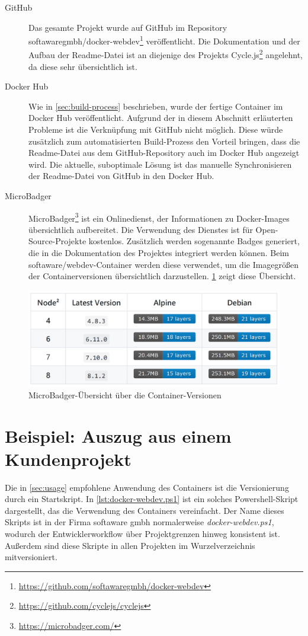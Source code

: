 \begin{description}
    \item[GitHub] Das gesamte Projekt wurde auf GitHub im Repository softawaregmbh/docker-webdev\footnote{\url{https://github.com/softawaregmbh/docker-webdev}} veröffentlicht.
        Die Dokumentation und der Aufbau der Readme-Datei ist an diejenige des Projekts Cycle.js\footnote{\url{https://github.com/cyclejs/cyclejs}} angelehnt, da diese sehr übersichtlich ist.
    \item[Docker Hub] Wie in \cref{sec:build-process} beschrieben, wurde der fertige Container im Docker Hub veröffentlicht.
        Aufgrund der in diesem Abschnitt erläuterten Probleme ist die Verknüpfung mit GitHub nicht möglich.
        Diese würde zusätzlich zum automatisierten Build-Prozess den Vorteil bringen, dass die Readme-Datei aus dem GitHub-Repository auch im Docker Hub angezeigt wird.
        Die aktuelle, suboptimale Lösung ist das manuelle Synchronisieren der Readme-Datei von GitHub in den Docker Hub.
    \item[MicroBadger] MicroBadger\footnote{\url{https://microbadger.com/}} ist ein Onlinedienst, der Informationen zu Docker-Images übersichtlich aufbereitet.
        Die Verwendung des Dienstes ist für Open-Source-Projekte kostenlos.
        Zusätzlich werden sogenannte Badges generiert, die in die Dokumentation des Projektes integriert werden können.
        Beim softaware/webdev-Container werden diese verwendet, um die Imagegrößen der Containerversionen übersichtlich darzustellen.
        \cref{fig:microbdager-versions} zeigt diese Übersicht.
\end{description}

\begin{figure}[htbp]
    \centering
    \includegraphics[width=0.75\linewidth,clip]{images/container-versions}
    \caption{MicroBadger-Übersicht über die Container-Versionen}
\label{fig:microbdager-versions}
\end{figure}


\section{Beispiel: Auszug aus einem Kundenprojekt}
\label{sec:example}
Die in \cref{sec:usage} empfohlene Anwendung des Containers ist die Versionierung durch ein Startskript.
In \cref{lst:docker-webdev.ps1} ist ein solches Powershell-Skript dargestellt, das die Verwendung des Containers vereinfacht.
Der Name dieses Skripts ist in der Firma softaware gmbh normalerweise \emph{docker-webdev.ps1}, wodurch der Entwicklerworkflow über Projektgrenzen hinweg konsistent ist.
Außerdem sind diese Skripte in allen Projekten im Wurzelverzeichnis mitversioniert.

